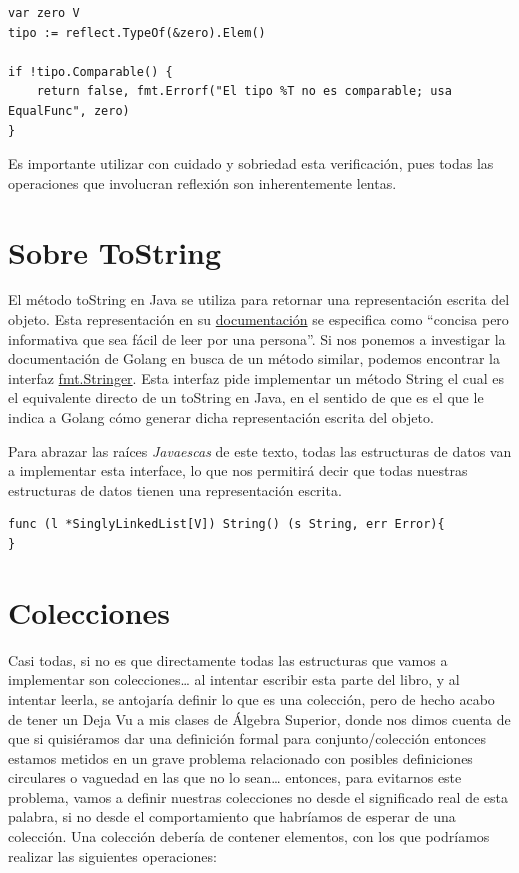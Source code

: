 \documentclass[11pt]{article}
\begin{document}
\begin{verbatim}
var zero V
tipo := reflect.TypeOf(&zero).Elem()

if !tipo.Comparable() {
	return false, fmt.Errorf("El tipo %T no es comparable; usa EqualFunc", zero)
}
\end{verbatim}

Es importante utilizar con cuidado y sobriedad esta verificación, pues todas las operaciones que involucran reflexión son inherentemente lentas.
\section{Sobre ToString}
\label{sec:orge5e6c48}

El método toString en Java se utiliza para retornar una representación escrita del objeto. Esta representación en su \href{https://docs.oracle.com/javase/8/docs/api/java/lang/Object.html\#toString--}{documentación}
se especifica como ``concisa pero informativa que sea fácil de leer por una persona''. Si nos ponemos a investigar la documentación de Golang en busca de un método similar, podemos encontrar la interfaz \href{https://pkg.go.dev/fmt\#example-Stringer}{fmt.Stringer}. Esta interfaz pide implementar un método String el cual es el equivalente directo de un toString en Java, en el sentido de que es el que le indica a Golang cómo generar dicha representación escrita del objeto.

Para abrazar las raíces \emph{Javaescas} de este texto, todas las estructuras de datos van a implementar esta interface, lo que nos permitirá decir que todas nuestras estructuras de datos tienen una representación escrita.

\begin{verbatim}
func (l *SinglyLinkedList[V]) String() (s String, err Error){
}
\end{verbatim}
\section{Colecciones}
\label{sec:orga63de2a}

Casi todas, si no es que directamente todas las estructuras que vamos a implementar son colecciones\ldots{} al intentar escribir esta parte del libro, y al intentar leerla, se antojaría definir lo que es una colección, pero de hecho acabo de tener un Deja Vu a mis clases de Álgebra Superior, donde nos dimos cuenta de que si quisiéramos dar una definición formal para conjunto/colección entonces estamos metidos en un grave problema relacionado con posibles definiciones circulares o vaguedad en las que no lo sean\ldots{} entonces, para evitarnos este problema, vamos a definir nuestras colecciones no desde el significado real de esta palabra, si no desde el comportamiento que habríamos de esperar de una colección. Una colección debería de contener elementos, con los que podríamos realizar las siguientes operaciones:
\end{document}
